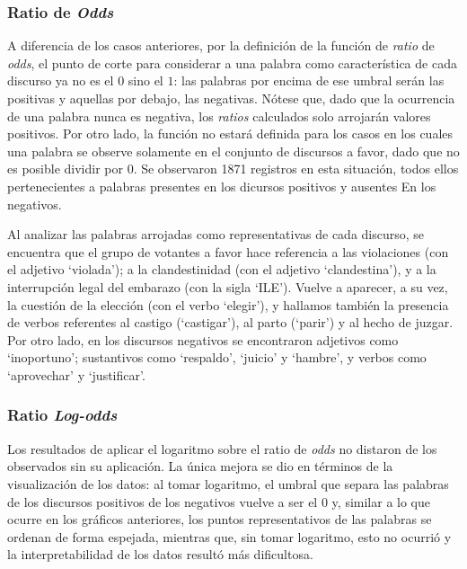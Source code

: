 \subsubsection{Ratio de \textit{Odds}}
A diferencia de los casos anteriores, por la definición de la función de
\textit{ratio} de \textit{odds}, el punto de corte para considerar
a una palabra como característica de cada discurso ya no es el $0$ sino el $1$:
las palabras por encima de ese umbral serán las positivas y aquellas por debajo,
las negativas. Nótese que, dado que la ocurrencia de una palabra nunca es negativa,
los \textit{ratios} calculados solo arrojarán valores positivos. Por otro lado,
la función no estará definida para los casos en los cuales una palabra se
observe solamente en el conjunto de discursos a favor, dado que no es posible
dividir por $0$. Se observaron 1871 registros en esta situación, todos ellos
pertenecientes a palabras presentes en los dicursos positivos y ausentes En
los negativos.
\par
Al analizar las palabras arrojadas como representativas de cada discurso, se
encuentra que el grupo de votantes a favor hace referencia a las violaciones
(con el adjetivo `violada'); a la clandestinidad (con el adjetivo `clandestina'),
y a la interrupción legal del embarazo (con la sigla `ILE'). Vuelve a aparecer,
a su vez, la cuestión de la elección (con el verbo `elegir'), y hallamos también
la presencia de verbos referentes al castigo (`castigar'), al parto (`parir') y
al hecho de juzgar. Por otro lado, en los discursos negativos se encontraron
adjetivos como `inoportuno'; sustantivos como `respaldo', `juicio' y `hambre', 
y verbos como `aprovechar' y `justificar'.

\subsubsection{Ratio \textit{Log-odds}}

Los resultados de aplicar el logaritmo sobre el ratio de \textit{odds} no distaron
de los observados sin su aplicación. La única mejora se dio en
términos de la visualización de los datos: al tomar logaritmo, el umbral que separa
las palabras de los discursos positivos de los negativos vuelve a ser el $0$ y,
similar a lo que ocurre en los gráficos anteriores, los puntos representativos
de las palabras se ordenan de forma espejada, mientras que, sin tomar logaritmo,
esto no ocurrió y la interpretabilidad de los datos resultó más dificultosa.

